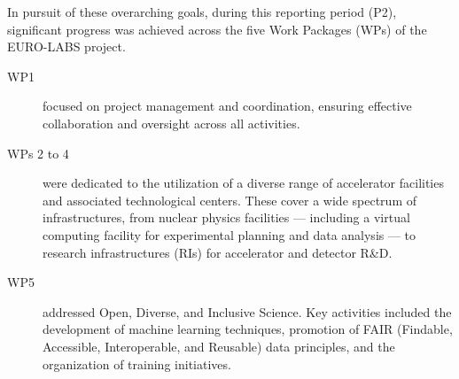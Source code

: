 In pursuit of these overarching goals,
during this reporting period (P2), significant progress was achieved across the five Work Packages (WPs) of the EURO-LABS project.

\begin{description}
    \item[WP1] focused on project management and coordination, ensuring effective collaboration and oversight across all activities.
    
    \item[WPs 2 to 4] were dedicated to the utilization of a diverse range of accelerator facilities and associated technological centers. These cover a wide spectrum of infrastructures, from nuclear physics facilities --- including a virtual computing facility for experimental planning and data analysis --- to research infrastructures (RIs) for accelerator and detector R\&D.
    
    \item[WP5] addressed Open, Diverse, and Inclusive Science. Key activities included the development of machine learning techniques, promotion of FAIR (Findable, Accessible, Interoperable, and Reusable) data principles, and the organization of training initiatives.
\end{description}

